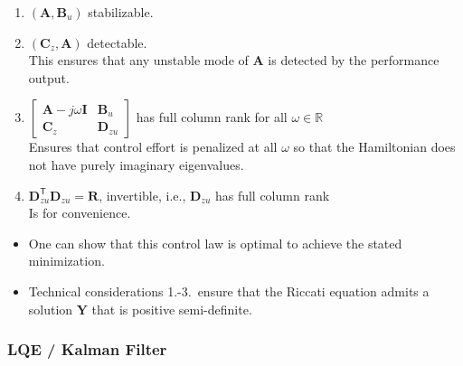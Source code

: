 \begin{enumerate}
    \item $(\mathbf{A},\mathbf{B}_u)$ stabilizable.
    \item $(\mathbf{C}_z,\mathbf{A})$ detectable.\\
          This ensures that any unstable mode of $\mathbf{A}$ is detected by the performance output.
    \item $\begin{bmatrix} \mathbf{A}- j\omega \mathbf{I}& \mathbf{B}_u\\ \mathbf{C}_z& \mathbf{D}_{zu}\end{bmatrix}$ has full column rank for all $\omega\in\mathbb{R}$\\
          Ensures that control effort is penalized at all $\omega$ so that the Hamiltonian does not have purely imaginary eigenvalues.
    \item $\mathbf{D}_{zu}^{\mathsf{T}}\mathbf{D}_{zu}=\mathbf{R}$, invertible, i.e., $\mathbf{D}_{zu}$ has full column rank\\
          Is for convenience.
\end{enumerate}

\newpar{}

\begin{itemize}
    \item One can show that this control law is optimal to achieve the stated minimization.
    \item Technical considerations 1.-3.\ ensure that the Riccati equation admits a solution $\mathbf{Y}$ that is positive semi-definite.
\end{itemize}

\subsubsection{LQE / Kalman Filter}


